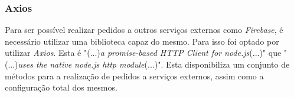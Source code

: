 \subsubsection{Axios}

Para ser possível realizar pedidos a outros serviços externos como \textit{Firebase}, é necessário utilizar uma biblioteca capaz do mesmo. Para isso foi optado por utilizar \textit{Axios}. Esta é "(...)\emph{a promise-based HTTP Client for node.js}(...)"\citep{axios} que "(...)\emph{uses the native node.js http module}(...)"\citep{axios}. Esta disponibiliza um conjunto de métodos para a realização de pedidos a serviços externos, assim como a configuração total dos mesmos.